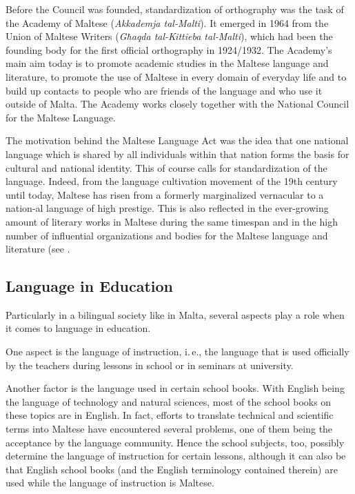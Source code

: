 \documentclass[]{../../metanetpaper}
\begin{document}
\begin{multicols}{2}
Before the Council was founded, standardization of orthography was the task of the Academy of Maltese (\emph{Akkademja tal-Malti}). It emerged in 1964 from the Union of Maltese Writers (\emph{Għaqda tal-Kittieba tal-Malti}), which had been the founding body for the first official orthography in 1924/1932. The Academy's main aim today is to promote academic studies in the Maltese language and literature, to promote the use of Maltese in every domain of everyday life and to build up contacts to people who are friends of the language and who use it outside of Malta\cite{Akkademja1}. The Academy works closely together with the National Council for the Maltese Language.

The motivation behind the Maltese Language Act was the idea that one national language which is shared by all individuals within that nation forms the basis for cultural and national identity. This of course calls for standardization of the language. Indeed, from the language cultivation movement of the 19th century until today, Maltese has risen from a formerly marginalized vernacular to a nation-al language of high prestige. This is also reflected in the ever-growing amount of literary works in Maltese during the same timespan and in the high number of influential organizations and bodies for the Maltese language and literature (see \cite{Fabri:2011a}.


\subsection{Language in Education}

Particularly in a bilingual society like in Malta, several aspects play a role when it comes to language in education. 

One aspect is the language of instruction, i.\,e., the language that is used officially by the teachers during lessons in school or in seminars at university. 

Another factor is the language used in certain school books. With English being the language of technology and natural sciences, most of the school books on these topics are in English. In fact, efforts to translate technical and scientific terms into Maltese have encountered several problems, one of them being the acceptance by the language community. Hence the school subjects, too, possibly determine the language of instruction for certain lessons, although it can also be that English school books (and the English terminology contained therein) are used while the language of instruction is Maltese.


\end{multicols}
\end{document}
